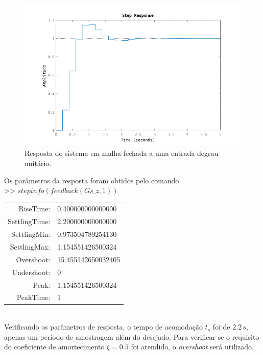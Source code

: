\documentclass{article}
\begin{document}
{        \begin{figure}[H]
           \centering
                \includegraphics[width=1\linewidth]{images/q2_step_response.png}
                \caption{Resposta do sistema em malha fechada a uma entrada degrau unitário.}
                \label{fig:q2_step_response}
        \end{figure}

        {Os parâmetros da resposta foram obtidos pelo comando\\
        >> $ stepinfo(feedback(Gs\_z, 1)) $ }\\
        \begin{tabular}{ r l }
            RiseTime: & 0.400000000000000\\
            SettlingTime: & 2.200000000000000\\
            SettlingMin: & 0.973504789254130\\
            SettlingMax: & 1.154551426500324\\
            Overshoot: & 15.455142650032405\\
            Undershoot: & 0\\
            Peak: & 1.154551426500324\\
            PeakTime: & 1\\
        \end{tabular}\\

        {Verificando os parâmetros de resposta, o tempo de acomodação $t_s$ foi
            de $2.2\,s$, apenas um período de amostragem além do desejado.}
        {Para verificar se o requisito do coeficiente de amortecimento
            $\zeta = 0.5$ foi atendido, o \textit{overshoot} será utilizado.}

}
\end{document}
